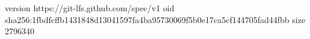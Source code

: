 version https://git-lfs.github.com/spec/v1
oid sha256:1fbdfcffb1431848d13041597fa4ba95730069f5b0e17ca5cf144705fad44fbb
size 2796340
